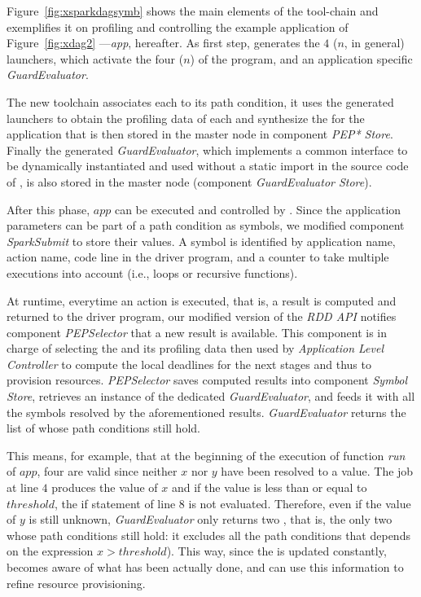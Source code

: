 Figure~\ref{fig:xsparkdagsymb} shows the main elements of the tool-chain and exemplifies it on profiling and controlling the example application of Figure~\ref{fig:xdag2} ---\textit{app}, hereafter. As first step, \dSymb generates the $4$ ($n$, in general) launchers, which activate the four ($n$) \plans of the program, and an application specific \textit{GuardEvaluator}. 

The new toolchain associates each \plan to its path condition, it uses the generated launchers to obtain the profiling data of each \plan and synthesize the \model for the application that is then stored in the master node in component \textit{PEP* Store}. Finally the generated \textit{GuardEvaluator}, which implements a common interface to be dynamically instantiated and used without a static import in the source code of \cSpark, is also stored in the master node (component \textit{GuardEvaluator Store}).

After this phase, $app$ can be executed and controlled by \cSpark. 
Since the application parameters can be part of a path condition as symbols, we modified component \textit{SparkSubmit} to store their values. A symbol is identified by application name, action name, code line in the driver program, and a counter to take multiple executions into account  (i.e., loops or recursive functions). 

At runtime, everytime an action is executed, that is, a result is computed and returned to the driver program, our modified version of the  \textit{RDD API} notifies component \textit{PEPSelector} that a new result is available. This component is in charge of selecting the \plan and its profiling data then used by \textit{Application Level Controller} to compute the local deadlines for the next stages and thus to provision resources. \textit{PEPSelector} saves computed results into component \textit{Symbol Store}, retrieves an instance of the dedicated \textit{GuardEvaluator}, and feeds it with all the symbols resolved 
by the aforementioned results. \textit{GuardEvaluator} returns the list of \plan whose path conditions still hold.

This means, for example, that at the beginning of the execution of function \textit{run} of $app$, four \plans are valid since neither $x$ nor $y$ have been resolved to a value. The job at line $4$ produces the value of $x$ and if the value is less than or equal to $threshold$,  the if statement of line $8$ is not evaluated. Therefore, even if the value of $y$ is still unknown, \textit{GuardEvaluator} only returns two \plans, that is, the only two \plans whose path conditions still hold: it excludes all the path conditions that depends on the expression $x > threshold$). This way, since the \plan is updated constantly, \cSpark becomes aware of what has been actually done, and can use this information to refine resource provisioning.  

